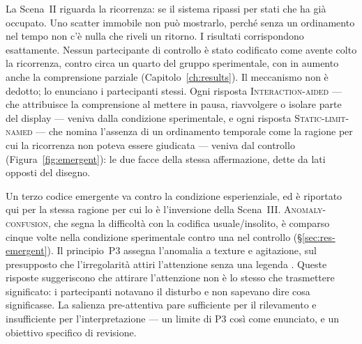 La Scena~II riguarda la ricorrenza: se il sistema ripassi per stati che ha già occupato. Uno scatter immobile non può mostrarlo, perché senza un ordinamento nel tempo non c'è nulla che riveli un ritorno. I risultati corrispondono esattamente. Nessun partecipante di controllo è stato codificato come avente colto la ricorrenza, contro circa un quarto del gruppo sperimentale, con in aumento anche la comprensione parziale (Capitolo~\ref{ch:results}). Il meccanismo non è dedotto; lo enunciano i partecipanti stessi. Ogni risposta \textsc{Interaction-aided} --- che attribuisce la comprensione al mettere in pausa, riavvolgere o isolare parte del display --- veniva dalla condizione sperimentale, e ogni risposta \textsc{Static-limit-named} --- che nomina l'assenza di un ordinamento temporale come la ragione per cui la ricorrenza non poteva essere giudicata --- veniva dal controllo (Figura~\ref{fig:emergent}): le due facce della stessa affermazione, dette da lati opposti del disegno.

Un terzo codice emergente va contro la condizione esperienziale, ed è riportato qui per la stessa ragione per cui lo è l'inversione della Scena~III. \textsc{Anomaly-confusion}, che segna la difficoltà con la codifica usuale/insolito, è comparso cinque volte nella condizione sperimentale contro una nel controllo (\S\ref{sec:res-emergent}). Il principio~P3 assegna l'anomalia a texture e agitazione, sul presupposto che l'irregolarità attiri l'attenzione senza una legenda \parencite{bertin1983, ware2021}. Queste risposte suggeriscono che attirare l'attenzione non è lo stesso che trasmettere significato: i partecipanti notavano il disturbo e non sapevano dire cosa significasse. La salienza pre-attentiva pare sufficiente per il rilevamento e insufficiente per l'interpretazione --- un limite di P3 così come enunciato, e un obiettivo specifico di revisione.

